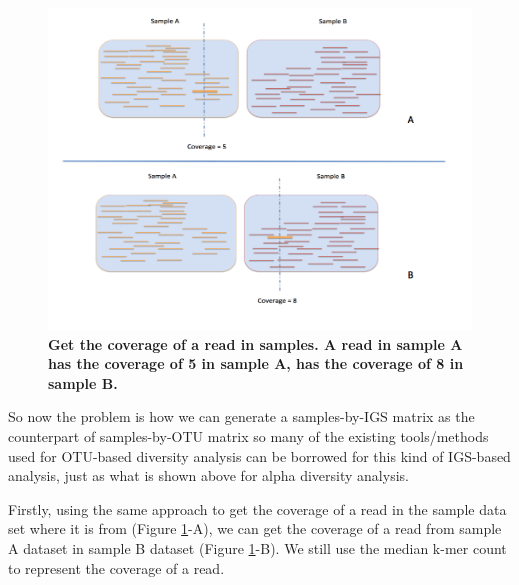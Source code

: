 \documentclass{article}
\begin{document}
\begin{figure}[!ht]
 \centerline{\includegraphics[width=6in]{./figures/read_coverage_samples.png}}
\caption{\bf Get the coverage of a read in samples. A read in sample A has the coverage of 5 in sample A, has
the coverage of 8 in sample B.}
\label{fig:read_coverage_samples}
\end{figure}



    
So now the problem is how we can generate a samples-by-IGS matrix as 
the counterpart of samples-by-OTU matrix so many of the existing 
tools/methods used for OTU-based diversity analysis can be borrowed for this kind 
of IGS-based analysis, just as what is shown above for alpha diversity analysis.

Firstly, using the same approach to get the coverage of a read in the sample data set where it is from 
(Figure \ref{fig:read_coverage_samples}-A), we can get the coverage of a read from sample A dataset in 
 sample B dataset (Figure \ref{fig:read_coverage_samples}-B). We still use the median k-mer count to represent 
the coverage of a read.  
\end{document}
